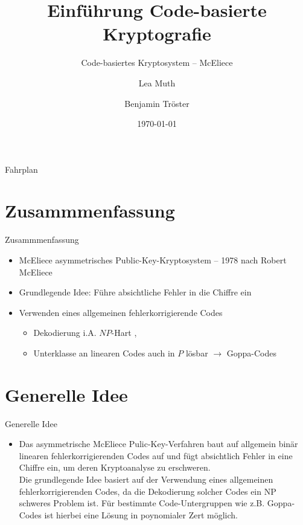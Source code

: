 \documentclass[11pt%
,aspectratio=169%
]{beamer}
\author{Lea Muth \and Benjamin Tröster}
\title[Code-basierte Kryptografie]{Einführung Code-basierte Kryptografie}
\subtitle{Code-basiertes Kryptosystem -- McEliece}
\date{\today}
\institute[FU Berlin]{Freie Universität Berlin}
\begin{document}
\begin{frame}
\titlepage
\end{frame}

\begin{frame}{Fahrplan}
\tableofcontents[hideothersubsections]
\end{frame}

\section*{Zusammmenfassung}
\begin{frame}{Zusammmenfassung}
	\begin{itemize}
		\item McEliece asymmetrisches Public-Key-Kryptosystem -- 1978 nach Robert McEliece \cite{McEliece1978public}
		\item Grundlegende Idee: Führe absichtliche Fehler in die Chiffre ein 
		\item Verwenden eines allgemeinen fehlerkorrigierende Codes
		\begin{itemize}
		    \item Dekodierung i.A. $NP$-Hart \cite[S. 479]{Schneier2007Applied}, \cite[S. 353ff]{Stinson2018Cryptography}
		    \item Unterklasse an linearen Codes auch in $P$ lösbar $\rightarrow$ Goppa-Codes
		\end{itemize}
	\end{itemize}
\end{frame}

\section{Generelle Idee}

\begin{frame}{Generelle Idee}
	\begin{itemize}
		\item 
		Das asymmetrische McEliece Pulic-Key-Verfahren baut auf allgemein binär linearen fehlerkorrigierenden Codes auf und fügt absichtlich Fehler in eine Chiffre ein, um deren Kryptoanalyse zu erschweren.
		\\Die grundlegende Idee basiert auf der Verwendung eines allgemeinen fehlerkorrigierenden Codes, da die Dekodierung solcher Codes ein NP schweres Problem ist. Für bestimmte Code-Untergruppen wie z.B. Goppa-Codes ist hierbei eine Lösung in poynomialer Zert möglich.
		
	\end{itemize}
\end{frame}
\end{document}
